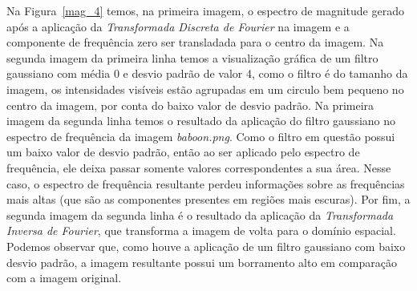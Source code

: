 \documentclass[twoside,twocolumn]{article}
\begin{document}
Na Figura~\ref{mag_4} temos, na primeira imagem, o espectro de magnitude gerado após a aplicação da \textit{Transformada Discreta de Fourier} na imagem e a componente de frequência zero ser transladada para o centro da imagem. Na segunda imagem da primeira linha temos a visualização gráfica de um filtro gaussiano com média 0 e desvio padrão de valor 4, como o filtro é do tamanho da imagem, os intensidades visíveis estão agrupadas em um circulo bem pequeno no centro da imagem, por conta do baixo valor de desvio padrão. Na primeira imagem da segunda linha temos o resultado da aplicação do filtro gaussiano no espectro de frequência da imagem \textit{baboon.png}. Como o filtro em questão possui um baixo valor de desvio padrão, então ao ser aplicado pelo espectro de frequência, ele deixa passar somente valores correspondentes a sua área. Nesse caso, o espectro de frequência resultante perdeu informações sobre as frequências mais altas (que são as componentes presentes em regiões mais escuras). Por fim, a segunda imagem da segunda linha é o resultado da aplicação da \textit{Transformada Inversa de Fourier}, que transforma a imagem de volta para o domínio espacial. Podemos observar que, como houve a aplicação de um filtro gaussiano com baixo desvio padrão, a imagem resultante possui um borramento alto em comparação com a imagem original.
\end{document}
